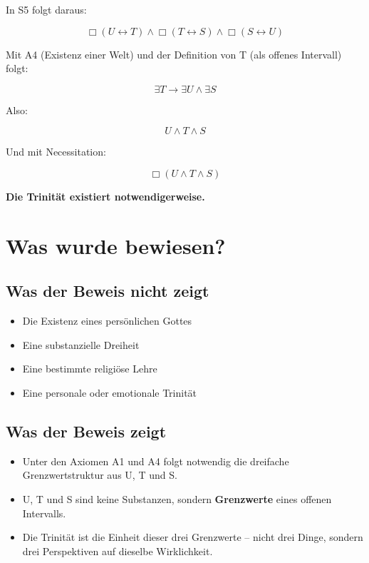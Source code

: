 \documentclass[
]{article}
\begin{document}
In S5 folgt daraus:

\[
\Box(U \leftrightarrow T) \land \Box(T \leftrightarrow S) \land \Box(S \leftrightarrow U)
\]

Mit A4 (Existenz einer Welt) und der Definition von T (als offenes Intervall) folgt:

\[
\exists T \rightarrow \exists U \land \exists S
\]

Also:

\[
\boxed{U \land T \land S}
\]

Und mit Necessitation:

\[
\boxed{\Box(U \land T \land S)}
\]

\textbf{Die Trinität existiert notwendigerweise.}

\section{Was wurde bewiesen?}\label{was-wurde-bewiesen}

\subsection{Was der Beweis nicht zeigt}\label{was-der-beweis-nicht-zeigt}

\begin{itemize}
\item Die Existenz eines persönlichen Gottes
\item Eine substanzielle Dreiheit
\item Eine bestimmte religiöse Lehre
\item Eine personale oder emotionale Trinität
\end{itemize}

\subsection{Was der Beweis zeigt}\label{was-der-beweis-zeigt}

\begin{itemize}
\item Unter den Axiomen A1 und A4 folgt notwendig die dreifache Grenzwertstruktur aus U, T und S.
\item U, T und S sind keine Substanzen, sondern \textbf{Grenzwerte} eines offenen Intervalls.
\item Die Trinität ist die Einheit dieser drei Grenzwerte – nicht drei Dinge, sondern drei Perspektiven auf dieselbe Wirklichkeit.
\end{itemize}
\end{document}
